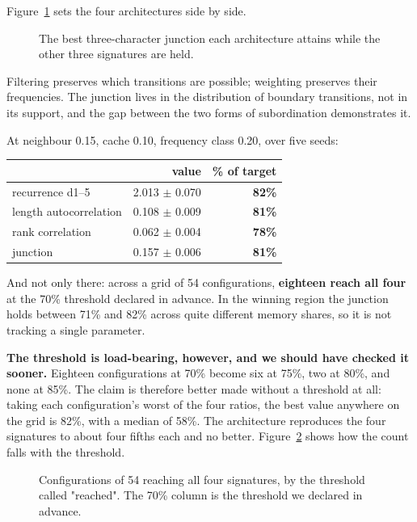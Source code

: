 \documentclass[11pt,a4paper]{article}
\begin{document}
Figure~\ref{fig:4} sets the four architectures side by side.


\begin{figure}[htbp]\centering

\caption{The best three-character junction each architecture attains while the other three signatures are held.}
\label{fig:4}
\end{figure}

Filtering preserves which transitions are possible; weighting preserves their frequencies. The junction lives in the distribution of boundary transitions, not in its support, and the gap between the two forms of subordination demonstrates it.


At neighbour 0.15, cache 0.10, frequency class 0.20, over five seeds:


\begin{table}[htbp]\centering\small
\begin{tabular}{@{}lrr@{}}
\toprule
 & value & \% of target \\
\midrule
recurrence d1--5 & 2.013 $\pm$ 0.070 & \textbf{82\%} \\
length autocorrelation & 0.108 $\pm$ 0.009 & \textbf{81\%} \\
rank correlation & 0.062 $\pm$ 0.004 & \textbf{78\%} \\
junction & 0.157 $\pm$ 0.006 & \textbf{81\%} \\
\bottomrule
\end{tabular}
\end{table}


And not only there: across a grid of 54 configurations, \textbf{eighteen reach all four} at the 70\% threshold declared in advance. In the winning region the junction holds between 71\% and 82\% across quite different memory shares, so it is not tracking a single parameter.


\textbf{The threshold is load-bearing, however, and we should have checked it sooner.} Eighteen configurations at 70\% become six at 75\%, two at 80\%, and none at 85\%. The claim is therefore better made without a threshold at all: taking each configuration's worst of the four ratios, the best value anywhere on the grid is 82\%, with a median of 58\%. The architecture reproduces the four signatures to about four fifths each and no better. Figure~\ref{fig:5} shows how the count falls with the threshold.


\begin{figure}[htbp]\centering

\caption{Configurations of 54 reaching all four signatures, by the threshold called "reached". The 70\% column is the threshold we declared in advance.}
\label{fig:5}
\end{figure}
\end{document}
